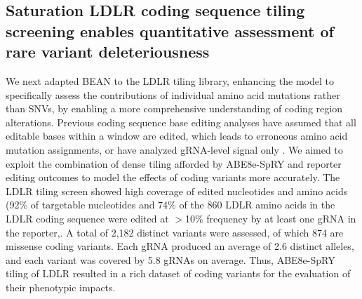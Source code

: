 \documentclass[a4paper, titlepage, openright]{book}
\begin{document}
\subsection{Saturation LDLR coding sequence tiling screening enables quantitative assessment of rare variant deleteriousness }
We next adapted BEAN to the LDLR tiling library, enhancing the model to specifically assess the contributions of individual amino acid mutations rather than SNVs, by enabling a more comprehensive understanding of coding region alterations. Previous coding sequence base editing analyses have assumed that all editable bases within a window are edited, which leads to erroneous amino acid mutation assignments, or have analyzed gRNA-level signal only \citep{martin2023massively}. We aimed to exploit the combination of dense tiling afforded by ABE8e-SpRY and reporter editing outcomes to model the effects of coding variants more accurately. The LDLR tiling screen showed high coverage of edited nucleotides and amino acids (92\% of targetable nucleotides and 74\% of the 860 LDLR amino acids in the LDLR coding sequence were edited at $>$10\% frequency by at least one gRNA in the reporter,. A total of 2,182 distinct variants were assessed, of which 874 are missense coding variants. Each gRNA produced an average of 2.6 distinct alleles, and each variant was covered by 5.8 gRNAs on average. Thus, ABE8e-SpRY tiling of LDLR resulted in a rich dataset of coding variants for the evaluation of their phenotypic impacts.
\end{document}
